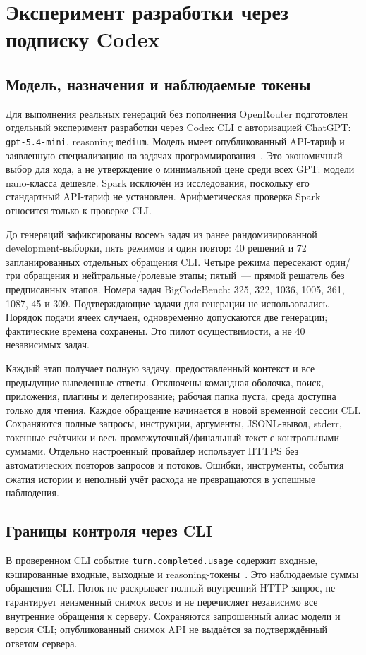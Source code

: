 \section{Эксперимент разработки через подписку Codex}\label{sec:codexpilot}

\subsection{Модель, назначения и наблюдаемые токены}
Для выполнения реальных генераций без пополнения OpenRouter подготовлен отдельный эксперимент разработки через Codex CLI с авторизацией ChatGPT: \texttt{gpt-5.4-mini}, reasoning \texttt{medium}. Модель имеет опубликованный API-тариф и заявленную специализацию на задачах программирования~\cite{openai54mini2026,openaipricing2026}. Это экономичный выбор для кода, а не утверждение о минимальной цене среди всех GPT: модели nano-класса дешевле. Spark исключён из исследования, поскольку его стандартный API-тариф не установлен. Арифметическая проверка Spark относится только к проверке CLI.

До генераций зафиксированы восемь задач из ранее рандомизированной development-выборки, пять режимов и один повтор: 40 решений и 72 запланированных отдельных обращения CLI. Четыре режима пересекают один/три обращения и нейтральные/ролевые этапы; пятый~--- прямой решатель без предписанных этапов. Номера задач BigCodeBench: 325, 322, 1036, 1005, 361, 1087, 45 и 309. Подтверждающие задачи для генерации не использовались. Порядок подачи ячеек случаен, одновременно допускаются две генерации; фактические времена сохранены. Это пилот осуществимости, а не 40 независимых задач.

Каждый этап получает полную задачу, предоставленный контекст и все предыдущие выведенные ответы. Отключены командная оболочка, поиск, приложения, плагины и делегирование; рабочая папка пуста, среда доступна только для чтения. Каждое обращение начинается в новой временной сессии CLI. Сохраняются полные запросы, инструкции, аргументы, JSONL-вывод, stderr, токенные счётчики и весь промежуточный/финальный текст с контрольными суммами. Отдельно настроенный провайдер использует HTTPS без автоматических повторов запросов и потоков. Ошибки, инструменты, события сжатия истории и неполный учёт расхода не превращаются в успешные наблюдения.

\subsection{Границы контроля через CLI}
В проверенном CLI событие \texttt{turn.completed.usage} содержит входные, кэшированные входные, выходные и reasoning-токены~\cite{codexexec2026}. Это наблюдаемые суммы обращения CLI. Поток не раскрывает полный внутренний HTTP-запрос, не гарантирует неизменный снимок весов и не перечисляет независимо все внутренние обращения к серверу. Сохраняются запрошенный алиас модели и версия CLI; опубликованный снимок API не выдаётся за подтверждённый ответом сервера.


